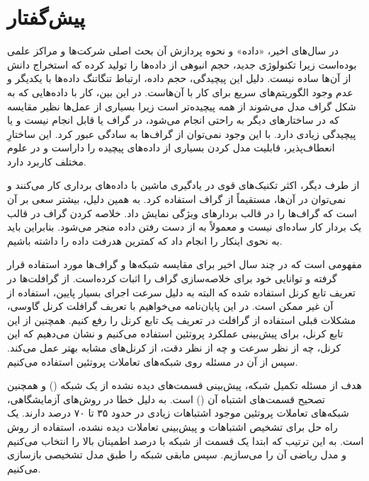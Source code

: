 \chapter*{پیش‌گفتار}

در سال‌های اخیر، «داده» و نحوه پردازش آن بحث اصلی شرکت‌ها و مراکز علمی بوده‌است زیرا تکنولوژی جدید، حجم انبوهی از داده‌ها را تولید کرده که استخراج دانش از آن‌ها سا‌ده نیست. دلیل این پیچیدگی، حجم داده، ارتباط تنگاتنگ داده‌ها با یکدیگر و عدم وجود الگوریتم‌های سریع برای کار با آن‌هاست. در این بین، کار با داده‌هایی که به شکل گراف مدل می‌شوند از همه پیچیده‌تر است زیرا بسیاری از عمل‌ها نظیر مقایسه که در ساختار‌های دیگر به راحتی انجام می‌شود، در گراف یا قابل انجام نیست و یا پیچیدگی زیادی دارد. با این وجود نمی‌توان از گراف‌ها به سادگی عبور کرد. این ساختارِ انعطاف‌پذیر، قابلیت مدل کردن بسیاری از داده‌های پیچیده را داراست و در علوم مختلف کاربرد دارد.

از طرف دیگر، اکثر تکنیک‌های قوی در یادگیری ماشین با داده‌های برداری کار می‌کنند و نمی‌توان در آن‌ها، مستقیماً از گراف‌ استفاده کرد. به همین دلیل، بیشتر سعی بر آن است که گراف‌ها را در قالب بردارهای ویژگی نمایش داد. خلاصه کردن گراف در قالب یک بردار کار ساده‌ای نیست و معمولاً به از دست رفتن داده منجر می‌شود. بنابراین باید به نحوی اینکار را انجام داد که کمترین هدرفت داده را داشته باشیم.

 مفهومی است که در چند سال اخیر برای مقایسه شبکه‌ها و گراف‌ها مورد استفاده قرار گرفته و توانایی خود برای خلاصه‌سازی گراف را اثبات کرده‌است. از گرافلت‌ها در تعریف تابع کرنل استفاده شده که البته به دلیل سرعت اجرای بسیار پایین، استفاده از آن غیر ممکن است. در این پایان‌نامه می‌خواهیم با تعریف گرافلت کرنل گاوسی، مشکلات قبلی استفاده از گرافلت در تعریف یک تابع کرنل را رفع کنیم. همچنین از این تابع کرنل، برای پیش‌بینی عملکرد پروتئین استفاده می‌کنیم و نشان می‌دهیم که این کرنل، چه از نظر سرعت و چه از نظر دقت، از کرنل‌های مشابه بهتر عمل می‌کند. سپس از آن در مسئله  روی شبکه‌های تعاملات پروتئین استفاده می‌کنیم.

هدف از مسئله تکمیل شبکه، پیش‌بینی قسمت‌های دیده نشده از یک شبکه () و همچنین تصحیح قسمت‌های اشتباه آن () است. به دلیل خطا در روش‌های آزمایشگاهی، شبکه‌های تعاملات پروتئین موجود اشتباهات زیادی در حدود ۳۵ تا ۷۰ درصد دارند. یک راه حل برای تشخیص اشتباهات و پیش‌بینی تعاملات دیده نشده، استفاده از روش  است. به این ترتیب که ابتدا یک قسمت از شبکه با درصد اطمینان بالا را انتخاب می‌کنیم و مدل ریاضی آن را می‌سازیم. سپس مابقی شبکه را طبق مدل تشخیصی بازسازی می‌کنیم.